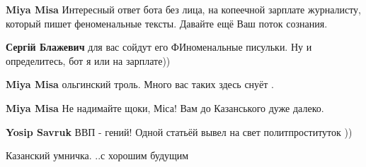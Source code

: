 \begin{itemize}
\begin{itemize}
 
\textbf{Miya Misa} Интересный ответ бота без лица, на копеечной зарплате журналисту, который пишет феноменальные тексты. Давайте ещё Ваш поток сознания.

 
\textbf{Сергій Блажевич} для вас сойдут его ФИноменальные писульки. Ну и определитесь, бот я или на зарплате))

 
\textbf{Miya Misa} ольгинский троль. Много вас таких здесь снуёт .

 
\textbf{Miya Misa} Не надимайте щоки, Міса! Вам до Казанського дуже далеко.

 
\textbf{Yosip Savruk} ВВП - гений! Одной статьёй вывел на свет политпроституток ))

 
Казанский умничка. ..с хорошим будущим
\end{itemize}

 

\end{itemize}
